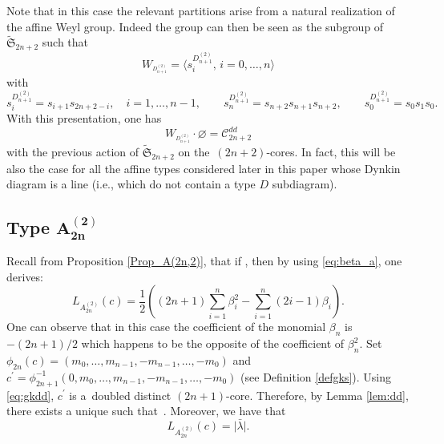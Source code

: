 \documentclass[10pt,a4paper]{amsart}
\numberwithin{equation}{section}
\newcommand{\cC}{\mathcal{C}}
\begin{document}
\begin{Remark}
 Note that in this case the relevant partitions arise from a natural realization of the affine Weyl group. Indeed the group  can then be seen as the subgroup of $\widetilde{
	\mathfrak{S}}_{2n+2}$ such that%
\begin{equation*}
W_{^{D_{n+1}^{(2)}}}=\bigl\langle s_{i}^{D_{n+1}^{(2)}},\, i=0,\dots ,n\bigr\rangle
\end{equation*}
	with
\[
s_{i}^{D_{n+1}^{(2)}}=s_{i+1}s_{2n+2-i},\quad i=1,\dots ,n-1 ,\qquad
s_{n}^{D_{n+1}^{(2)}}=s_{n+2}s_{n+1}s_{n+2}, \qquad
s_{0}^{D_{n+1}^{(2)}}=s_0s_1 s_{0}.
\]
With this presentation, one has
\[
W_{^{D_{n+1}^{(2)}}}\cdot \varnothing =\cC_{2n+2}^{dd}
\]
 with the previous action of
$\widetilde{ \mathfrak{S}}_{2n+2}$ on the~$(2n+2)$-cores. In fact, this will be also the case for all the affine types considered later in this paper whose Dynkin diagram is a line (i.e., which do not contain a type $D$ subdiagram).
\end{Remark}


\subsection[Type A\_\{2n\}\^{}(2)]{Type $\boldsymbol{A_{2n}^{(2)}}$}

Recall from Proposition \ref{Prop_A(2n,2)}, that if  , then by using \eqref{eq:beta_a}, one derives:
\begin{equation*}
L_{A_{2n}^{(2)}}(c)=\frac{1}{2}\left( (2n+1)\sum_{i=1}^{n}\beta
_{i}^{2}-\sum_{i=1}^{n}(2i-1)\beta _{i}\right) .
\end{equation*}%
One can observe that in this case the coefficient of the monomial $\beta _{n}
$ is $-(2n+1)/2$ which happens to be the opposite of the coefficient of $%
\beta _{n}^{2}$. Set $\phi _{2n}(c)=(m_{0},\dots ,m_{n-1},-m_{n-1},\dots
,-m_{0})$ and $c^{\prime }=\phi _{2n+1}^{-1}(0,m_{0},\dots
,m_{n-1},-m_{n-1},\dots ,-m_{0})$ (see Definition \ref{defgks}). Using %
\eqref{eq:gkdd}, $c^{\prime }$ is a~doubled distinct $(2n+1)$-core.
Therefore, by Lemma \ref{lem:dd}, there exists a unique \smash{$\bar{\lambda}\in \cC_{2n+1}^{d,r}$} such that~. Moreover,
we have that
\begin{equation*}
L_{A_{2n}^{(2)}}(c)=\bigl\lvert \bar{\lambda}\bigr\rvert .
\end{equation*}
\end{document}
